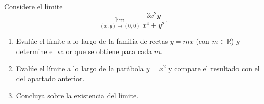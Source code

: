 Considere el límite
\[
\lim_{(x,y)\to(0,0)} \frac{3x^2 y}{x^4 + y^2}.
\]
\begin{enumerate}
    \item Evalúe el límite a lo largo de la familia de rectas $y = mx$ (con $m \in \mathbb{R}$) y determine el valor que se obtiene para cada $m$.
    \item Evalúe el límite a lo largo de la parábola $y = x^2$ y compare el resultado con el del apartado anterior.
    \item Concluya sobre la existencia del límite.
\end{enumerate}
